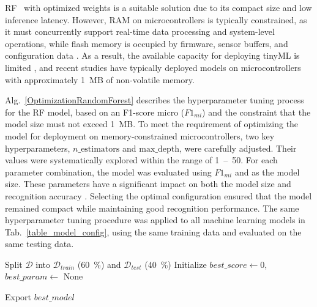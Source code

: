 \documentclass[journal,twoside,web]{ieeecolor}
\begin{document}
RF~\cite{DaoHieu2022,ViManhTuyen2024} with optimized weights is a suitable solution due to its compact size and low inference latency. However, RAM on microcontrollers is typically constrained, as it must concurrently support real-time data processing and system-level operations, while flash memory is occupied by firmware, sensor buffers, and configuration data \cite{TinyML2023}. As a result, the available capacity for deploying tinyML is limited \cite{SurveyTinyML2023}, and recent studies \cite{Tiny_machine_on_microcontroller,TinyMLOnEmbedded2025,RIOT_tinyML2025} have typically deployed models on microcontrollers with approximately 1~MB of non-volatile memory.

Alg.~\ref{OptimizationRandomForest} describes the hyperparameter tuning process for the RF model, based on an F1-score micro ($F1_{mi}$) and the constraint that the model size must not exceed 1~MB. To meet the requirement of optimizing the model for deployment on memory-constrained microcontrollers, two key hyperparameters, $n\_\text{estimators}$ and $\text{max\_depth}$, were carefully adjusted. Their values were systematically explored within the range of 1~--~50. For each parameter combination, the model was evaluated using $F1_{mi}$ and as the model size. These parameters have a significant impact on both the model size and recognition accuracy \cite{Tuning_RandomForest2023, Tuning_RandomForest2024}. Selecting the optimal configuration ensured that the model remained compact while maintaining good recognition performance. The same hyperparameter tuning procedure was applied to all machine learning models in Tab.~\ref{table_model_config}, using the same training data and evaluated on the same testing data.


\begin{algorithm}
\footnotesize
\caption{\footnotesize Hyperparameter optimization for ML}
\label{OptimizationRandomForest}

Split $\mathcal{D}$ into $\mathcal{D}_{train}$ (60~\%) and $\mathcal{D}_{test}$ (40~\%) \;
Initialize $best\_score \leftarrow 0$, $best\_param \leftarrow$ None \;


Export $best\_model$\;
\end{algorithm}
\end{document}
